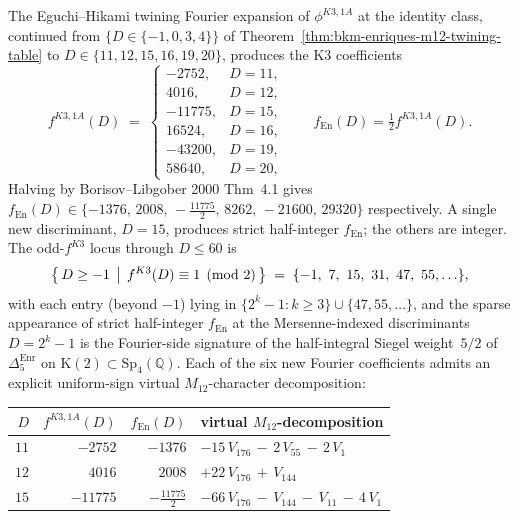 \begin{theorem}
\label{thm:bkm-enriques-m12-twining-table-extended}
The Eguchi--Hikami twining Fourier expansion of $\phi^{K3, 1A}$ at the
identity class, continued from $\{D\in\{-1,0,3,4\}\}$ of
Theorem~\ref{thm:bkm-enriques-m12-twining-table} to
$D\in\{11, 12, 15, 16, 19, 20\}$, produces the K3 coefficients
\[
 f^{K3, 1A}(D) \;=\;
 \begin{cases}
 -2752, & D = 11, \\
 4016, & D = 12, \\
 -11775, & D = 15, \\
 16524, & D = 16, \\
 -43200, & D = 19, \\
 58640, & D = 20,
 \end{cases}
 \qquad
 f_{\mathrm{En}}(D) = \tfrac{1}{2}f^{K3, 1A}(D).
\]
Halving by Borisov--Libgober 2000 Thm~4.1 gives
$f_{\mathrm{En}}(D)\in\{-1376,\,2008,\,-\tfrac{11775}{2},\,8262,\,-21600,\,29320\}$
respectively. A single new discriminant, $D = 15$, produces strict
half-integer $f_{\mathrm{En}}$; the others are integer. The odd-$f^{K3}$
locus through $D\leq 60$ is
\[
 \bigl\{\,D\geq -1\,\bigm|\,f^{K3}(D)\equiv 1 \pmod{2}\,\bigr\}
 \;=\;\{-1,\ 7,\ 15,\ 31,\ 47,\ 55, \ldots\},
\]
with each entry (beyond $-1$) lying in
$\{2^{k}-1 : k\geq 3\}\cup\{47, 55, \ldots\}$, and the sparse appearance
of strict half-integer $f_{\mathrm{En}}$ at the Mersenne-indexed
discriminants $D = 2^k - 1$ is the Fourier-side signature of the
half-integral Siegel weight~$5/2$ of $\Delta_5^{\mathrm{Enr}}$ on
$\mathrm{K}(2)\subset\mathrm{Sp}_4(\mathbb{Q})$. Each of the six new
Fourier coefficients admits an explicit uniform-sign virtual
$M_{12}$-character decomposition:
\begin{center}
\renewcommand{\arraystretch}{1.12}
\begin{tabular}{r|r|r|l}
\toprule
$D$ & $f^{K3,1A}(D)$ & $f_{\mathrm{En}}(D)$
 & virtual $M_{12}$-decomposition \\
\midrule
$11$ & $-2752$ & $-1376$ & $-15\,V_{176}\,-\,2\,V_{55}\,-\,2\,V_1$ \\
$12$ & $4016$ & $2008$ & $+22\,V_{176}\,+\,V_{144}$ \\
$15$ & $-11775$ & $-\tfrac{11775}{2}$ & $-66\,V_{176}\,-\,V_{144}\,-\,V_{11}\,-\,4\,V_1$ \\

\end{tabular}
\end{center}
\end{theorem}
